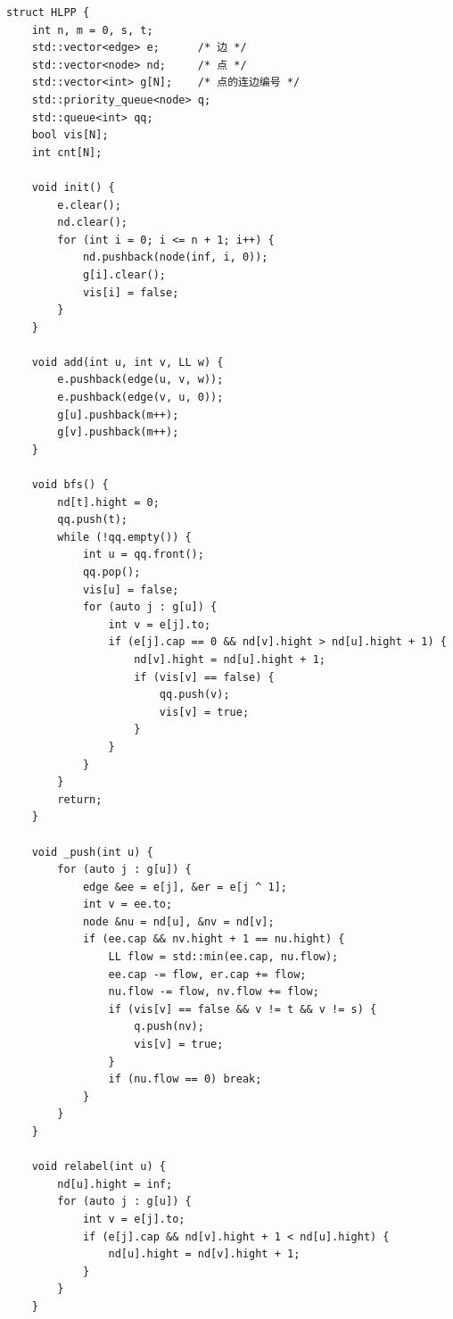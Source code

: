 \documentclass[UTF8, a4paper, titlepage, twoside]{ctexart}
\begin{document}
\begin{lstlisting}[style=cpp]
struct HLPP {
    int n, m = 0, s, t;
    std::vector<edge> e;      /* 边 */
    std::vector<node> nd;     /* 点 */
    std::vector<int> g[N];    /* 点的连边编号 */
    std::priority_queue<node> q;
    std::queue<int> qq;
    bool vis[N];
    int cnt[N];

    void init() {
        e.clear();
        nd.clear();
        for (int i = 0; i <= n + 1; i++) {
            nd.pushback(node(inf, i, 0));
            g[i].clear();
            vis[i] = false;
        }
    }

    void add(int u, int v, LL w) {
        e.pushback(edge(u, v, w));
        e.pushback(edge(v, u, 0));
        g[u].pushback(m++);
        g[v].pushback(m++);
    }

    void bfs() {
        nd[t].hight = 0;
        qq.push(t);
        while (!qq.empty()) {
            int u = qq.front();
            qq.pop();
            vis[u] = false;
            for (auto j : g[u]) {
                int v = e[j].to;
                if (e[j].cap == 0 && nd[v].hight > nd[u].hight + 1) {
                    nd[v].hight = nd[u].hight + 1;
                    if (vis[v] == false) {
                        qq.push(v);
                        vis[v] = true;
                    }
                }
            }
        }
        return;
    }

    void _push(int u) {
        for (auto j : g[u]) {
            edge &ee = e[j], &er = e[j ^ 1];
            int v = ee.to;
            node &nu = nd[u], &nv = nd[v];
            if (ee.cap && nv.hight + 1 == nu.hight) {
                LL flow = std::min(ee.cap, nu.flow);
                ee.cap -= flow, er.cap += flow;
                nu.flow -= flow, nv.flow += flow;
                if (vis[v] == false && v != t && v != s) {
                    q.push(nv);
                    vis[v] = true;
                }
                if (nu.flow == 0) break;
            }
        }
    }

    void relabel(int u) {
        nd[u].hight = inf;
        for (auto j : g[u]) {
            int v = e[j].to;
            if (e[j].cap && nd[v].hight + 1 < nd[u].hight) {
                nd[u].hight = nd[v].hight + 1;
            }
        }
    }


\end{lstlisting}
\end{document}
